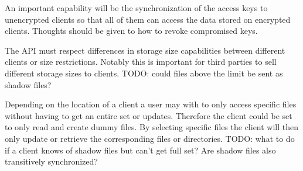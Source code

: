 \begin{description}[leftmargin=2em,style=nextline,noitemsep,nolistsep]
\item[Encryption Key Management]
    An important capability will be the synchronization of the access keys to unencrypted clients so that all of them can access the data stored on encrypted clients.
    Thoughts should be given to how to revoke compromised keys.
\item[Space Management]
    The API must respect differences in storage size capabilities between different clients or size restrictions.
    Notably this is important for third parties to sell different storage sizes to clients.
    TODO: could files above the limit be sent as shadow files?
\item[Shadow Files]
    Depending on the location of a client a user may with to only access specific files without having to get an entire set or updates.
    Therefore the client could be set to only read and create dummy files.
    By selecting specific files the client will then only update or retrieve the corresponding files or directories.
    TODO: what to do if a client knows of shadow files but can't get full set?
    Are shadow files also transitively synchronized?
\end{description}
